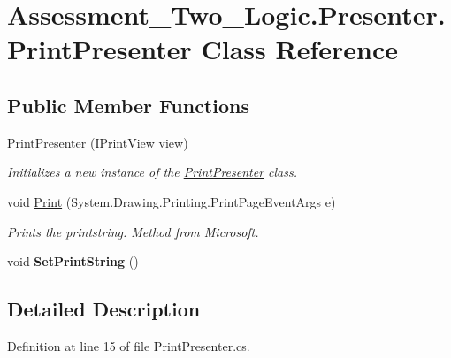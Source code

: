 \hypertarget{class_assessment___two___logic_1_1_presenter_1_1_print_presenter}{
\section{Assessment\_\-Two\_\-Logic.Presenter.PrintPresenter Class Reference}
\label{class_assessment___two___logic_1_1_presenter_1_1_print_presenter}
}
\subsection*{Public Member Functions}
\begin{DoxyCompactItemize}
\item 
\hyperlink{class_assessment___two___logic_1_1_presenter_1_1_print_presenter_a259141310aae7e6a82d4bea7bcc09064}{PrintPresenter} (\hyperlink{interface_assessment___two___logic_1_1_interfaces_1_1_i_print_view}{IPrintView} view)
\begin{DoxyCompactList}\small\item\em Initializes a new instance of the \hyperlink{class_assessment___two___logic_1_1_presenter_1_1_print_presenter}{PrintPresenter} class. \item\end{DoxyCompactList}\item 
void \hyperlink{class_assessment___two___logic_1_1_presenter_1_1_print_presenter_a6b4be0536fa1f661accaf50eff15cc56}{Print} (System.Drawing.Printing.PrintPageEventArgs e)
\begin{DoxyCompactList}\small\item\em Prints the printstring. Method from Microsoft. \item\end{DoxyCompactList}\item 
\hypertarget{class_assessment___two___logic_1_1_presenter_1_1_print_presenter_acefdcfea09431495e1784246af57a18f}{
void {\bfseries SetPrintString} ()}
\label{class_assessment___two___logic_1_1_presenter_1_1_print_presenter_acefdcfea09431495e1784246af57a18f}

\end{DoxyCompactItemize}


\subsection{Detailed Description}


Definition at line 15 of file PrintPresenter.cs.



